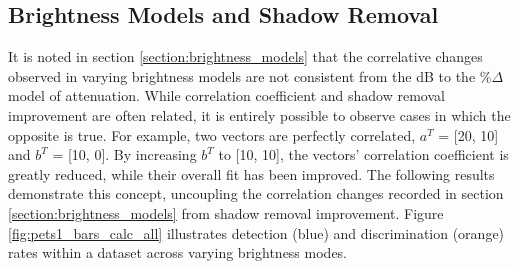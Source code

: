 \documentclass[12pt]{report}
\begin{document}
\subsection{Brightness Models and Shadow Removal}

It is noted in section \ref{section:brightness_models} that the correlative changes observed in varying brightness models are not consistent from the dB to the \%$\Delta$ model of attenuation. While correlation coefficient and shadow removal improvement are often related, it is entirely possible to observe cases in which the opposite is true. For example, two vectors are perfectly correlated, $a^T$ = [20, 10] and $b^T$ = [10, 0]. By increasing $b^T$ to [10, 10], the vectors' correlation coefficient is greatly reduced, while their overall fit has been improved. The following results demonstrate this concept, uncoupling the correlation changes recorded in section \ref{section:brightness_models} from shadow removal improvement. Figure \ref{fig:pets1_bars_calc_all} illustrates detection (blue) and discrimination (orange) rates within a dataset across varying brightness modes.
\end{document}
